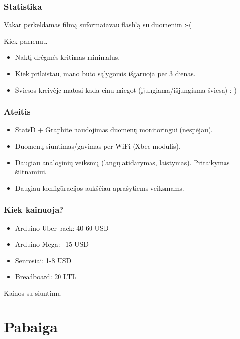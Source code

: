 \documentclass[12pt,a4paper]{beamer}
\begin{document}
\begin{frame}
    \frametitle{Statistika}

    \begin{center}
        Vakar perkeldamas filmą suformatavau flash'ą su duomenim :-(
    \end{center}

    \pause
    Kiek pamenu\ldots
    \begin{itemize}
        \item Naktį drėgmės kritimas minimalus.
        \item Kiek prilaistau, mano buto sąlygomis išgaruoja per 3 dienas.
        \item Šviesos kreivėje matosi kada einu miegot (įjungiama/išjungiama šviesa) :-)
    \end{itemize}

\end{frame}

\begin{frame}
    \frametitle{Ateitis}

    \begin{itemize}
        \item StatsD + Graphite naudojimas duomenų monitoringui (nespėjau).
        \item Duomenų siuntimas/gavimas per WiFi (Xbee modulis).
        \item Daugiau analoginių veiksmų (langų atidarymas, laistymas). Pritaikymas šiltnamiui.
        \item Daugiau konfigūracijos aukščiau aprašytiems veiksmams.
    \end{itemize}
    
\end{frame}

\begin{frame}
    \frametitle{Kiek kainuoja?}

    \begin{itemize}
        \item Arduino Uber pack: 40-60 USD
        \item Arduino Mega: ~15 USD
        \item Senrosiai: 1-8 USD
        \item Breadboard: 20 LTL
    \end{itemize}
    Kainos su siuntimu
\end{frame}

\section{Pabaiga}
\end{document}
